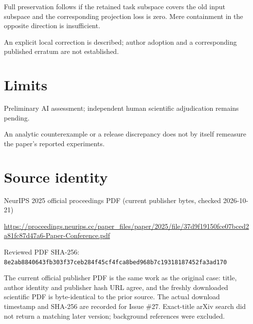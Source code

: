 \documentclass[11pt]{article}
\begin{document}
Full preservation follows if the retained task subspace covers the old input subspace and the corresponding projection loss is zero. Mere containment in the opposite direction is insufficient.

An explicit local correction is described; author adoption and a corresponding published erratum are not established.

\section*{Limits}

Preliminary AI assessment; independent human scientific adjudication remains pending.\par

An analytic counterexample or a release discrepancy does not by itself remeasure the paper’s reported experiments.\par

\section*{Source identity}

NeurIPS 2025 official proceedings PDF (current publisher bytes, checked 2026-10-21)

\url{https://proceedings.neurips.cc/paper_files/paper/2025/file/37d9f19150fce07bced2a81fc87d47a6-Paper-Conference.pdf}

Reviewed PDF SHA-256: \nolinkurl{8e2ab8840643fb303f37ceb284f45cf4fca8bed968b7c19318187452fa3ad170}

The current official publisher PDF is the same work as the original case: title, author identity and publisher hash URL agree, and the freshly downloaded scientific PDF is byte-identical to the prior source. The actual download timestamp and SHA-256 are recorded for Issue \#27. Exact-title arXiv search did not return a matching later version; background references were excluded.
\end{document}
